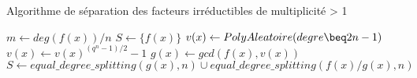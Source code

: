 \begin{algorithm}
  \label{alg:splitting}
  \caption{Algorithme de séparation des facteurs irr\'eductibles de multiplicité > 1}
  \begin{algorithmic}[1]
    \Statex
        \State {}
      \EndIf
      \State $m \gets deg(f(x))/n $
      \State $S \gets \{f(x)\}$
        \State $v(x) \gets PolyAleatoire(degre \beq 2n-1)$
        \State $v(x) \gets v(x)^{(q^n-1)/2}-1$
        \State $g(x) \gets gcd(f(x), v(x))$
          \State $S \gets equal\_degree\_splitting(g(x), n) \cup equal\_degree\_splitting(f(x)/g(x), n)$
        \EndIf
      \EndWhile
      \State {}
    \EndFunction
  \end{algorithmic}
\end{algorithm}
